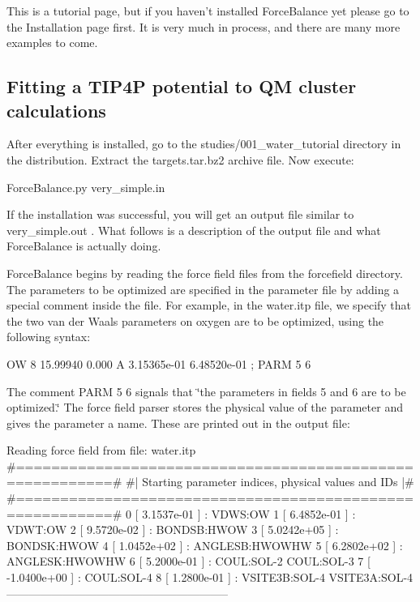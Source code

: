 This is a tutorial page, but if you haven't installed Force\-Balance yet please go to the Installation page first. It is very much in process, and there are many more examples to come.\hypertarget{tutorial_tip4p}{}\subsection{Fitting a T\-I\-P4\-P potential to Q\-M cluster calculations}\label{tutorial_tip4p}
After everything is installed, go to the {\ttfamily studies/001\-\_\-water\-\_\-tutorial} directory in the distribution. Extract the {\ttfamily targets.\-tar.\-bz2} archive file. Now execute\-:

\begin{DoxyVerb}ForceBalance.py very_simple.in
\end{DoxyVerb}


If the installation was successful, you will get an output file similar to {\ttfamily very\-\_\-simple.\-out} . What follows is a description of the output file and what Force\-Balance is actually doing.

Force\-Balance begins by reading the force field files from the {\ttfamily forcefield} directory. The parameters to be optimized are specified in the parameter file by adding a special comment inside the file. For example, in the {\ttfamily water.\-itp} file, we specify that the two van der Waals parameters on oxygen are to be optimized, using the following syntax\-:

\begin{DoxyVerb}OW      8     15.99940     0.000       A    3.15365e-01  6.48520e-01 ; PARM 5 6
\end{DoxyVerb}


The comment {\ttfamily P\-A\-R\-M 5 6} signals that \char`\"{}the parameters in fields 5
and 6 are to be optimized.\char`\"{} The force field parser stores the physical value of the parameter and gives the parameter a name. These are printed out in the output file\-:

\begin{DoxyVerb}Reading force field from file: water.itp
#=========================================================#
#|  Starting parameter indices, physical values and IDs  |#
#=========================================================#
   0 [  3.1537e-01 ] : VDWS:OW
   1 [  6.4852e-01 ] : VDWT:OW
   2 [  9.5720e-02 ] : BONDSB:HWOW
   3 [  5.0242e+05 ] : BONDSK:HWOW
   4 [  1.0452e+02 ] : ANGLESB:HWOWHW
   5 [  6.2802e+02 ] : ANGLESK:HWOWHW
   6 [  5.2000e-01 ] : COUL:SOL-2 COUL:SOL-3
   7 [ -1.0400e+00 ] : COUL:SOL-4
   8 [  1.2800e-01 ] : VSITE3B:SOL-4 VSITE3A:SOL-4
-----------------------------------------------------------
\end{DoxyVerb}


